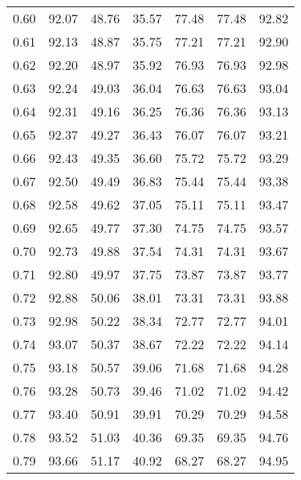 \begin{tabular}{|c|c|c|c|c|c|c|}
      0.60 &     92.07 &     48.76 &      35.57 &   77.48 &      77.48 &         92.82 \\
      0.61 &     92.13 &     48.87 &      35.75 &   77.21 &      77.21 &         92.90 \\
      0.62 &     92.20 &     48.97 &      35.92 &   76.93 &      76.93 &         92.98 \\
      0.63 &     92.24 &     49.03 &      36.04 &   76.63 &      76.63 &         93.04 \\
      0.64 &     92.31 &     49.16 &      36.25 &   76.36 &      76.36 &         93.13 \\
      0.65 &     92.37 &     49.27 &      36.43 &   76.07 &      76.07 &         93.21 \\
      0.66 &     92.43 &     49.35 &      36.60 &   75.72 &      75.72 &         93.29 \\
      0.67 &     92.50 &     49.49 &      36.83 &   75.44 &      75.44 &         93.38 \\
      0.68 &     92.58 &     49.62 &      37.05 &   75.11 &      75.11 &         93.47 \\
      0.69 &     92.65 &     49.77 &      37.30 &   74.75 &      74.75 &         93.57 \\
      0.70 &     92.73 &     49.88 &      37.54 &   74.31 &      74.31 &         93.67 \\
      0.71 &     92.80 &     49.97 &      37.75 &   73.87 &      73.87 &         93.77 \\
      0.72 &     92.88 &     50.06 &      38.01 &   73.31 &      73.31 &         93.88 \\
      0.73 &     92.98 &     50.22 &      38.34 &   72.77 &      72.77 &         94.01 \\
      0.74 &     93.07 &     50.37 &      38.67 &   72.22 &      72.22 &         94.14 \\
      0.75 &     93.18 &     50.57 &      39.06 &   71.68 &      71.68 &         94.28 \\
      0.76 &     93.28 &     50.73 &      39.46 &   71.02 &      71.02 &         94.42 \\
      0.77 &     93.40 &     50.91 &      39.91 &   70.29 &      70.29 &         94.58 \\
      0.78 &     93.52 &     51.03 &      40.36 &   69.35 &      69.35 &         94.76 \\
      0.79 &     93.66 &     51.17 &      40.92 &   68.27 &      68.27 &         94.95 \\

\end{tabular}
